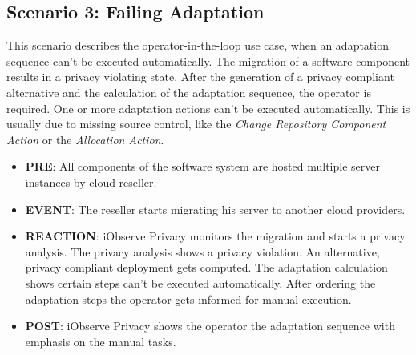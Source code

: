 \subsection{Scenario 3: Failing Adaptation}
\label{eval:scenario:3}
This scenario describes the operator-in-the-loop use case, when an adaptation sequence can't be executed automatically. The migration of a software component results in a privacy violating state. After the generation of a privacy compliant alternative and the calculation of the adaptation sequence, the operator is required. One or more adaptation actions can't be executed automatically. This is usually due to missing source control, like the \textit{Change Repository Component Action} or the \textit{Allocation Action}.
\begin{itemize}
	\setlength\itemsep{0em}
	\item \textbf{PRE}: All components of the software system are hosted multiple server instances by cloud reseller. 
	\item \textbf{EVENT}: The reseller starts migrating his server to another cloud providers.
	\item \textbf{REACTION}: iObserve Privacy monitors the migration and starts a privacy analysis. The privacy analysis shows a privacy violation. An alternative, privacy compliant deployment gets computed. The adaptation calculation shows certain steps can't be executed automatically. After ordering the adaptation steps the operator gets informed for manual execution.
	\item \textbf{POST}: iObserve Privacy shows the operator the adaptation sequence with emphasis on the manual tasks.
\end{itemize}


